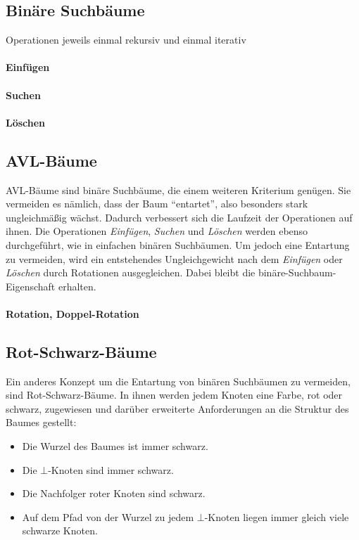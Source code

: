 \subsection{Binäre Suchbäume}

Operationen jeweils einmal rekursiv und einmal iterativ
\paragraph{Einfügen}
\paragraph{Suchen}
\paragraph{Löschen}

\subsection{AVL-Bäume}
AVL-Bäume sind binäre Suchbäume, die einem weiteren Kriterium genügen.
Sie vermeiden es nämlich, dass der Baum "`entartet"', also besonders stark ungleichmäßig wächst.
Dadurch verbessert sich die Laufzeit der Operationen auf ihnen.
Die Operationen \textit{Einfügen}, \textit{Suchen} und \textit{Löschen} werden ebenso durchgeführt,
wie in einfachen binären Suchbäumen.
Um jedoch eine Entartung zu vermeiden,
wird ein entstehendes Ungleichgewicht nach dem \textit{Einfügen} oder \textit{Löschen} durch Rotationen ausgegleichen.
Dabei bleibt die binäre-Suchbaum-Eigenschaft erhalten.

\paragraph{Rotation, Doppel-Rotation}

\subsection{Rot-Schwarz-Bäume}
Ein anderes Konzept um die Entartung von binären Suchbäumen zu vermeiden, sind Rot-Schwarz-Bäume.
In ihnen werden jedem Knoten eine Farbe, rot oder schwarz,
zugewiesen und darüber erweiterte Anforderungen an die Struktur des Baumes gestellt:
\begin{itemize}
	\item Die Wurzel des Baumes ist immer schwarz.
	\item Die $\bot$-Knoten sind immer schwarz.
	\item Die Nachfolger roter Knoten sind schwarz.
	\item Auf dem Pfad von der Wurzel zu jedem $\bot$-Knoten liegen immer gleich viele schwarze Knoten.
\end{itemize}


